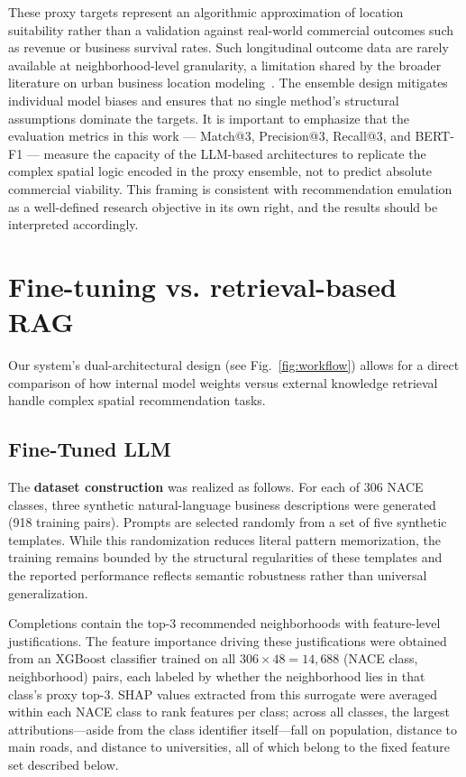 \documentclass[pdflatex,sn-mathphys-num]{sn-jnl}%
\theoremstyle{thmstyleone}%
\theoremstyle{thmstyletwo}%
\theoremstyle{thmstylethree}%
\begin{document}
These proxy targets represent an algorithmic approximation of location suitability rather than a validation against real-world commercial outcomes such as revenue or business survival rates. Such longitudinal outcome data are rarely available at neighborhood-level granularity, a limitation shared by the broader literature on urban business location modeling~\cite{han2024}. The ensemble design mitigates individual model biases and ensures that no single method's structural assumptions dominate the targets. It is important to emphasize that the evaluation metrics in this work — Match@3, Precision@3, Recall@3, and BERT-F1 — measure the capacity of the LLM-based architectures to replicate the complex spatial logic encoded in the proxy ensemble, not to predict absolute commercial viability. This framing is consistent with recommendation emulation as a well-defined research objective in its own right, and the results should be interpreted accordingly.


\section{Fine-tuning vs. retrieval-based RAG}\label{sec:finetuningvsRAG}

Our system's dual-architectural design (see Fig.~\ref{fig:workflow}) allows for a direct comparison of how internal model weights versus external knowledge retrieval handle complex spatial recommendation tasks.

\subsection{Fine-Tuned LLM}

The \textbf{dataset construction} was realized as follows. For each of 306 NACE classes, three synthetic natural-language business descriptions were generated (918 training pairs). Prompts are selected randomly from a set of five synthetic templates. While this randomization reduces literal pattern memorization, the training remains bounded by the structural regularities of these templates and the reported performance reflects semantic robustness rather than universal generalization. 

Completions contain the top-3 recommended neighborhoods with feature-level justifications. The feature importance driving these justifications were obtained from an XGBoost classifier trained on all $306\times48=14{,}688$ (NACE class, neighborhood) pairs, each labeled by whether the neighborhood lies in that class's proxy top-3. SHAP values extracted from this surrogate were averaged within each NACE class to rank features per class; across all classes, the largest attributions---aside from the class identifier itself---fall on population, distance to main roads, and distance to universities, all of which belong to the fixed feature set described below. 
\end{document}
